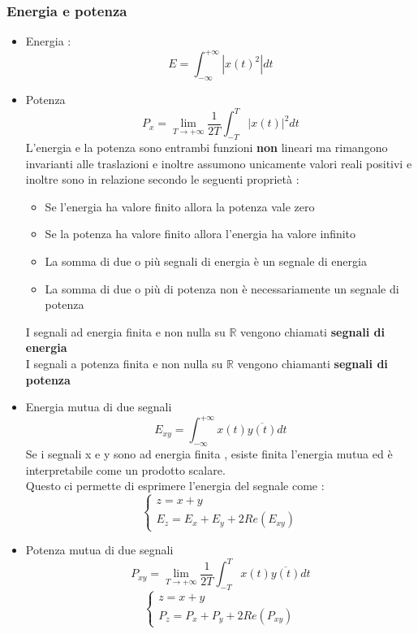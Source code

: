 \documentclass{article}
\theoremstyle{definition}
\newcommand{\R}{\mathbb{R}}
\newcommand{\intinf}{\int_{-\infty}^{+\infty}}
\begin{document}
\subsubsection{Energia e potenza }
\begin{itemize}
\item Energia : 
$$E=\intinf|x(t)^2| dt$$ 
\item Potenza 
$$P_x=\lim_{T \rightarrow +\infty}\frac{1}{2T} \int_{-T}^{T}|x(t)|^2dt$$
L'energia e la potenza sono entrambi funzioni \textbf{non} lineari ma rimangono invarianti alle traslazioni e inoltre assumono unicamente valori reali positivi e inoltre sono in relazione secondo le seguenti proprietà : 
\begin{itemize}
	\item Se l'energia ha valore finito allora la potenza vale zero 
	\item Se la potenza ha valore finito allora l'energia ha valore infinito
	\item La somma di due o più segnali di energia è un segnale di energia 
	\item La somma di due o più di potenza non è necessariamente un segnale di potenza 
\end{itemize}
I segnali ad energia finita e non nulla su $\R$ vengono chiamati \textbf{segnali di energia}\\
I segnali a potenza finita e non nulla su $\R$ vengono chiamanti \textbf{segnali di potenza}
\item Energia mutua di due segnali 
$$E_{xy}=\intinf x(t)\overline{y(t)}dt$$
Se i segnali x e y sono ad energia finita , esiste finita l'energia mutua ed è interpretabile come un prodotto scalare. \\ Questo ci permette di esprimere l'energia del segnale come : 
$$\begin{cases}
	z=x+y \\
	E_z=E_x+E_y+2Re(E_{xy})
\end{cases}$$  
\item Potenza mutua di due segnali 
$$P_{xy}=\lim_{T \rightarrow +\infty}\frac{1}{2T} \int_{-T}^{T}x(t)\overline{y(t)}dt$$
$$\begin{cases}
	z=x+y \\
	P_z=P_x+P_y+2Re(P_{xy})
\end{cases}$$  
\end{itemize}
\end{document}
